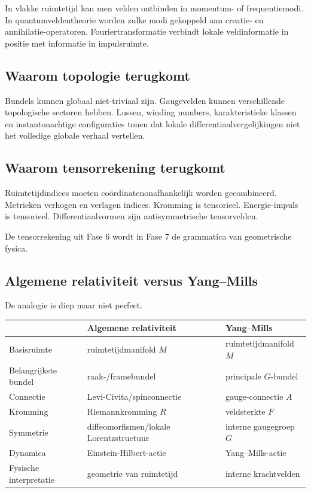 \documentclass[11pt,a4paper]{article}
\begin{document}
In vlakke ruimtetijd kan men velden ontbinden in momentum- of frequentiemodi. In quantumveldentheorie worden zulke modi gekoppeld aan creatie- en annihilatie-operatoren. Fouriertransformatie verbindt lokale veldinformatie in positie met informatie in impulsruimte.

\subsection{Waarom topologie terugkomt}

Bundels kunnen globaal niet-triviaal zijn. Gaugevelden kunnen verschillende topologische sectoren hebben. Lussen, winding numbers, karakteristieke klassen en instantonachtige configuraties tonen dat lokale differentiaalvergelijkingen niet het volledige globale verhaal vertellen.

\subsection{Waarom tensorrekening terugkomt}

Ruimtetijdindices moeten coördinatenonafhankelijk worden gecombineerd. Metrieken verhogen en verlagen indices. Kromming is tensorieel. Energie-impuls is tensorieel. Differentiaalvormen zijn antisymmetrische tensorvelden.

De tensorrekening uit Fase 6 wordt in Fase 7 de grammatica van geometrische fysica.

\subsection{Algemene relativiteit versus Yang--Mills}

De analogie is diep maar niet perfect.

\begin{longtable}{>{\raggedright\arraybackslash}p{} p{} p{}}
\toprule
 & Algemene relativiteit & Yang--Mills \\
\midrule
Basisruimte & ruimtetijdmanifold $M$ & ruimtetijdmanifold $M$ \\
Belangrijkste bundel & raak-/framebundel & principale $G$-bundel \\
Connectie & Levi-Civita/spinconnectie & gauge-connectie $A$ \\
Kromming & Riemannkromming $R$ & veldsterkte $F$ \\
Symmetrie & diffeomorfismen/lokale Lorentzstructuur & interne gaugegroep $G$ \\
Dynamica & Einstein-Hilbert-actie & Yang--Mills-actie \\
Fysische interpretatie & geometrie van ruimtetijd & interne krachtvelden \\
\bottomrule
\end{longtable}
\end{document}
